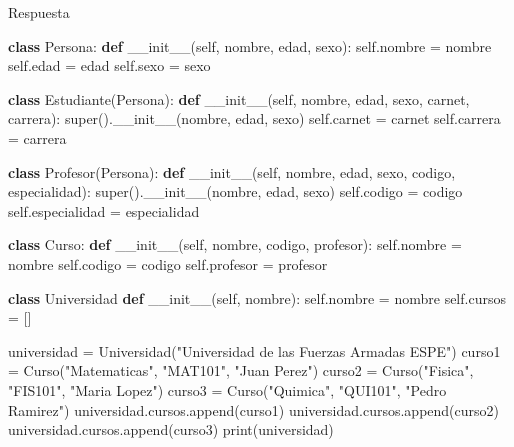 \documentclass[
  a4paper,
  DIV=11,
  numbers=noendperiod,
  onepage,
  openany]{scrreprt}
\newenvironment{Shaded}{\begin{snugshade}}{\end{snugshade}}
\newcommand{\BuiltInTok}[1]{\textcolor[rgb]{0.00,0.23,0.31}{#1}}
\newcommand{\FunctionTok}[1]{\textcolor[rgb]{0.28,0.35,0.67}{#1}}
\newcommand{\KeywordTok}[1]{\textcolor[rgb]{0.00,0.23,0.31}{\textbf{#1}}}
\newcommand{\NormalTok}[1]{\textcolor[rgb]{0.00,0.23,0.31}{#1}}
\newcommand{\OperatorTok}[1]{\textcolor[rgb]{0.37,0.37,0.37}{#1}}
\newcommand{\StringTok}[1]{\textcolor[rgb]{0.13,0.47,0.30}{#1}}
\newcommand{\VariableTok}[1]{\textcolor[rgb]{0.07,0.07,0.07}{#1}}
\begin{document}
Respuesta

\begin{Shaded}
\begin{Highlighting}[]
\KeywordTok{class}\NormalTok{ Persona:}
    \KeywordTok{def} \FunctionTok{\_\_init\_\_}\NormalTok{(}\VariableTok{self}\NormalTok{, nombre, edad, sexo):}
        \VariableTok{self}\NormalTok{.nombre }\OperatorTok{=}\NormalTok{ nombre}
        \VariableTok{self}\NormalTok{.edad }\OperatorTok{=}\NormalTok{ edad}
        \VariableTok{self}\NormalTok{.sexo }\OperatorTok{=}\NormalTok{ sexo}

\KeywordTok{class}\NormalTok{ Estudiante(Persona):}
    \KeywordTok{def} \FunctionTok{\_\_init\_\_}\NormalTok{(}\VariableTok{self}\NormalTok{, nombre, edad, sexo, carnet, carrera):}
        \BuiltInTok{super}\NormalTok{().}\FunctionTok{\_\_init\_\_}\NormalTok{(nombre, edad, sexo)}
        \VariableTok{self}\NormalTok{.carnet }\OperatorTok{=}\NormalTok{ carnet}
        \VariableTok{self}\NormalTok{.carrera }\OperatorTok{=}\NormalTok{ carrera}

\KeywordTok{class}\NormalTok{ Profesor(Persona):}
    \KeywordTok{def} \FunctionTok{\_\_init\_\_}\NormalTok{(}\VariableTok{self}\NormalTok{, nombre, edad, sexo, codigo, especialidad):}
        \BuiltInTok{super}\NormalTok{().}\FunctionTok{\_\_init\_\_}\NormalTok{(nombre, edad, sexo)}
        \VariableTok{self}\NormalTok{.codigo }\OperatorTok{=}\NormalTok{ codigo}
        \VariableTok{self}\NormalTok{.especialidad }\OperatorTok{=}\NormalTok{ especialidad}

\KeywordTok{class}\NormalTok{ Curso:}
    \KeywordTok{def} \FunctionTok{\_\_init\_\_}\NormalTok{(}\VariableTok{self}\NormalTok{, nombre, codigo, profesor):}
        \VariableTok{self}\NormalTok{.nombre }\OperatorTok{=}\NormalTok{ nombre}
        \VariableTok{self}\NormalTok{.codigo }\OperatorTok{=}\NormalTok{ codigo}
        \VariableTok{self}\NormalTok{.profesor }\OperatorTok{=}\NormalTok{ profesor}

\KeywordTok{class}\NormalTok{ Universidad}
    \KeywordTok{def} \FunctionTok{\_\_init\_\_}\NormalTok{(}\VariableTok{self}\NormalTok{, nombre):}
        \VariableTok{self}\NormalTok{.nombre }\OperatorTok{=}\NormalTok{ nombre}
        \VariableTok{self}\NormalTok{.cursos }\OperatorTok{=}\NormalTok{ []}

\NormalTok{universidad }\OperatorTok{=}\NormalTok{ Universidad(}\StringTok{"Universidad de las Fuerzas Armadas ESPE"}\NormalTok{)}
\NormalTok{curso1 }\OperatorTok{=}\NormalTok{ Curso(}\StringTok{"Matematicas"}\NormalTok{, }\StringTok{"MAT101"}\NormalTok{, }\StringTok{"Juan Perez"}\NormalTok{)}
\NormalTok{curso2 }\OperatorTok{=}\NormalTok{ Curso(}\StringTok{"Fisica"}\NormalTok{, }\StringTok{"FIS101"}\NormalTok{, }\StringTok{"Maria Lopez"}\NormalTok{)}
\NormalTok{curso3 }\OperatorTok{=}\NormalTok{ Curso(}\StringTok{"Quimica"}\NormalTok{, }\StringTok{"QUI101"}\NormalTok{, }\StringTok{"Pedro Ramirez"}\NormalTok{)}
\NormalTok{universidad.cursos.append(curso1)}
\NormalTok{universidad.cursos.append(curso2)}
\NormalTok{universidad.cursos.append(curso3)}
\BuiltInTok{print}\NormalTok{(universidad)}


\end{Highlighting}
\end{Shaded}
\end{document}
